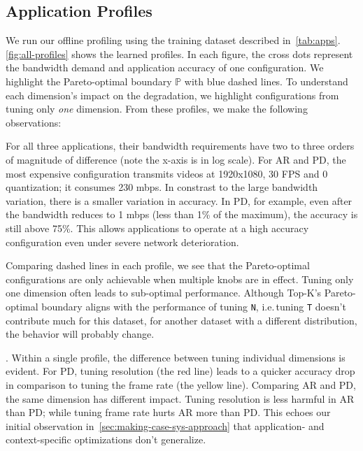 \subsection{Application Profiles}
\label{sec:application-profiles}

We run our offline profiling using the training dataset described
in~\autoref{tab:apps}.  \autoref{fig:all-profiles} shows the learned
profiles. In each figure, the cross dots represent the bandwidth demand and
application accuracy of one configuration. We highlight the Pareto-optimal
boundary $\mathbb{P}$ with blue dashed lines. To understand each dimension's
impact on the degradation, we highlight configurations from tuning only
\textit{one} dimension. From these profiles, we make the following observations:

 For all three applications, their bandwidth
requirements have two to three orders of magnitude of difference (note the
x-axis is in log scale). For AR and PD, the most expensive configuration
transmits videos at 1920x1080, 30 FPS and 0 quantization; it consumes 230
mbps. In constrast to the large bandwidth variation, there is a smaller
variation in accuracy. In PD, for example, even after the bandwidth reduces to 1
mbps (less than 1\% of the maximum), the accuracy is still above 75\%. This
allows \sysname{} applications to operate at a high accuracy configuration even
under severe network deterioration.

 Comparing dashed lines in each
profile, we see that the Pareto-optimal configurations are only achievable when
multiple knobs are in effect. Tuning only one dimension often leads to
sub-optimal performance. Although Top-K's Pareto-optimal boundary aligns with
the performance of tuning \texttt{N}, i.e.\,tuning \texttt{T} doesn't contribute
much for this dataset, for another dataset with a different distribution,
the behavior will probably change.

. Within a single profile, the
difference between tuning individual dimensions is evident. For PD, tuning
resolution (the red line) leads to a quicker accuracy drop in comparison to
tuning the frame rate (the yellow line). Comparing AR and PD, the same dimension
has different impact. Tuning resolution is less harmful in AR than PD; while
tuning frame rate hurts AR more than PD\@. This echoes our initial observation
in~\autoref{sec:making-case-sys-approach} that application- and context-specific
optimizations don't generalize.

